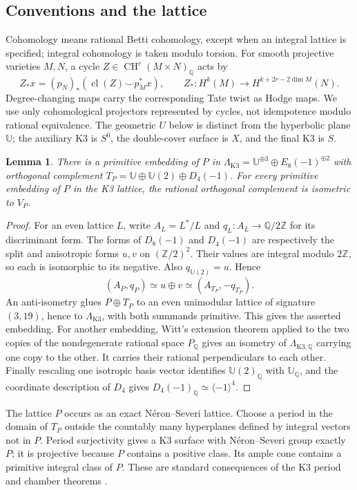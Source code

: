 \documentclass[11pt]{amsart}
\newcommand{\Q}{\mathbb Q}
\newcommand{\Z}{\mathbb Z}
\DeclareMathOperator{\CH}{CH}
\DeclareMathOperator{\cl}{cl}
\newtheorem{lemma}[theorem]{Lemma}
\theoremstyle{definition}
\theoremstyle{remark}
\numberwithin{equation}{section}
\begin{document}
\subsection{Conventions and the lattice}

Cohomology means rational Betti cohomology, except when an integral
lattice is specified; integral cohomology is taken modulo torsion.
For smooth projective varieties $M,N$, a cycle
$Z\in\CH^r(M\times N)_{\Q}$ acts by
\[
 Z_*x=(p_N)_*(\cl(Z)\smile p_M^*x),\qquad
 Z_*:H^k(M)\longrightarrow H^{k+2r-2\dim M}(N).
\]
Degree-changing maps carry the corresponding Tate twist as Hodge maps.
We use only cohomological projectors represented by cycles, not
idempotence modulo rational equivalence.  The geometric $U$ below is
distinct from the hyperbolic plane $\mathbb U$; the auxiliary K3 is
$S^0$, the double-cover surface is $X$, and the final K3 is $S$.

\begin{lemma}\label{main:lattice}
There is a primitive embedding of $P$ in
$\Lambda_{\mathrm{K3}}=\mathbb U^{\oplus3}\oplus E_8(-1)^{\oplus2}$
with orthogonal complement
$T_P=\mathbb U\oplus\mathbb U(2)\oplus D_4(-1)$.
For every primitive embedding of $P$ in the K3 lattice, the rational
orthogonal complement is isometric to $V_P$.
\end{lemma}
\begin{proof}
For an even lattice $L$, write $A_L=L^*/L$ and
$q_L:A_L\to\Q/2\Z$ for its discriminant form.  The forms of
$D_8(-1)$ and $D_4(-1)$ are respectively the split and anisotropic
forms $u,v$ on $(\Z/2)^2$.  Their values are integral modulo $2\Z$,
so each is isomorphic to its negative.  Also
$q_{\mathbb U(2)}=u$.  Hence
\[
 (A_P,q_P)\simeq u\oplus v\simeq(A_{T_P},-q_{T_P}).
\]
An anti-isometry glues $P\oplus T_P$ to an even unimodular lattice
of signature $(3,19)$, hence to $\Lambda_{\mathrm{K3}}$, with both
summands primitive.  This gives the asserted embedding.
For another embedding, Witt's extension theorem
\cite[Corollary~7.2.8]{PetersSterk} applied to the two
copies of the nondegenerate rational space $P_{\Q}$ gives an isometry
of $\Lambda_{\mathrm{K3},\Q}$ carrying one copy to the other.  It carries
their rational perpendiculars to each other.  Finally rescaling one
isotropic basis vector identifies $\mathbb U(2)_{\Q}$ with
$\mathbb U_{\Q}$, and the coordinate description of $D_4$ gives
$D_4(-1)_{\Q}\simeq\langle-1\rangle^4$.
\end{proof}

The lattice $P$ occurs as an exact N\'eron--Severi lattice.  Choose a
period in the domain of $T_P$ outside the countably many hyperplanes
defined by integral vectors not in $P$.  Period surjectivity gives a
K3 surface with N\'eron--Severi group exactly $P$; it is projective
because $P$ contains a positive class.  Its ample cone contains a
primitive integral class of $P$.  These are standard consequences of
the K3 period and chamber theorems \cite{Huybrechts}.
\end{document}
